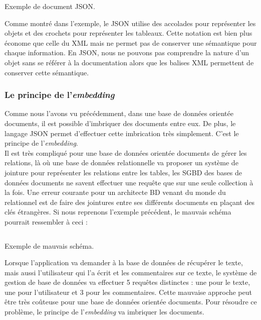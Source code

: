   \begin{listing}[H]
    \inputminted{json}{code/exemple.json}
    \caption{Exemple de document JSON.}
  \end{listing}

  Comme montré dans l'exemple, le JSON utilise des accolades pour représenter les objets et des crochets pour représenter les tableaux. Cette notation est bien plus économe que celle du XML mais ne permet pas de conserver une sémantique pour chaque information. En JSON, nous ne pouvons pas comprendre la nature d'un objet sans se référer à la documentation alors que les balises XML permettent de conserver cette sémantique.

  \subsubsection{Le principe de l'\textit{embedding}}

  Comme nous l'avons vu précédemment, dans une base de données orientée documents, il est possible d'imbriquer des documents entre eux. De plus, le langage JSON permet d'effectuer cette imbrication très simplement. C'est le principe de l'\textit{embedding}.\\

  Il est très compliqué pour une base de données orientée documents de gérer les relations, là où une base de données relationnelle va proposer un système de jointure pour représenter les relations entre les tables, les SGBD des bases de données documents ne savent effectuer une requête que sur une seule collection à la fois. Une erreur courante pour un architecte BD venant du monde du relationnel est de faire des jointures entre ses différents documents en plaçant des clés étrangères. Si nous reprenons l'exemple précédent, le mauvais schéma pourrait ressembler à ceci :

  \begin{listing}[H]
    \inputminted{json}{code/exempleMauvaisSchema.json}
    \caption{Exemple de mauvais schéma.}
  \end{listing}

  Lorsque l'application va demander à la base de données de récupérer le texte, mais aussi l'utilisateur qui l'a écrit et les commentaires sur ce texte, le système de gestion de base de données va effectuer 5 requêtes distinctes : une pour le texte, une pour l'utilisateur et 3 pour les commentaires. Cette mauvaise approche peut être très coûteuse pour une base de données orientée documents. Pour résoudre ce problème, le principe de l'\textit{embedding} va imbriquer les documents.\\

